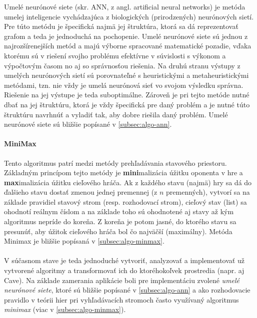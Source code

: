 Umelé neurónové siete (skr. ANN, z angl. artificial neural networks) je metóda umelej inteligencie vychádzajúca z
biologických (prirodzených) neurónových sietí.
Pre túto metódu je špecifická najmä jej štruktúra, ktorá sa dá reprezentovať grafom a teda je jednoduchá na pochopenie.
Umelé neurónové siete sú jednou z najrozšírenejších metód a majú výborne spracované matematické pozadie, vďaka ktorému
sú v riešení svojho problému efektívne v súvislosti s výkonom a výpočtovým časom no aj so správnosťou riešenia.
Na druhú stranu výstupy z umelých neurónových sietí sú porovnateľné s heuristickými a metaheuristickými metódami, tzn.
nie vždy je umelá neurónová sieť vo svojom výsledku správna.
Riešenie na jej výstupe je teda suboptimálne.
Zároveň je pri tejto metóde nutné dbať na jej štruktúru, ktorá je vždy špecifická pre daný problém a je nutné túto
štruktúru navrhnúť a vyladiť tak, aby dobre riešila daný problém.
Umelé neurónové siete sú bližšie popísané v \autoref{subsec:algo-ann}.

\paragraph{MiniMax}

Tento algoritmus patrí medzi metódy prehľadávania stavového priestoru.
Základným princípom tejto metódy je \textbf{mini}malizácia úžitku oponenta v hre a \textbf{max}imalizácia úžitku
cieľového hráča.
Ak z každého stavu (najmä) hry sa dá do ďalšieho stavu dostať zmenou jednej premennej (z $n$ premenných),
vytvorí sa na základe pravidiel stavový strom (resp. rozhodovací strom), cieľový stav (list) sa ohodnotí reálnym číslom
a na základe toho sú ohodnotené aj stavy až kým algoritmus nepríde do koreňa.
Z koreňa je potom jasné, do ktorého stavu sa presunúť, aby úžitok cieľového hráča bol čo najväčší (maximálny).
Metóda Minimax je bližšie popísaná v \autoref{subsec:algo-minmax}.
\\
\\
V súčasnom stave je teda jednoduché vytvoriť, analyzovať a implementovať už vytvorené algoritmy a transformovať ich
do ktoréhokoľvek prostredia (napr. aj Cave).
Na základe zamerania aplikácie boli pre implementáciu zvolené \emph{umelé neurónové siete}, ktoré sú bližšie popísané v
\autoref{subsec:algo-ann} a ako rozhodovacie pravidlo v teórii hier pri vyhľadávacích stromoch často využívaný
algoritmus \emph{minimax} (viac v \autoref{subsec:algo-minmax}).
